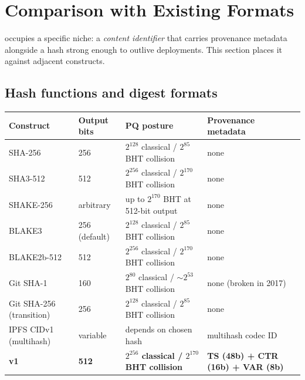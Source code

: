 \section{Comparison with Existing Formats}
\label{sec:comparison}

\tesserahash{} occupies a specific niche: a \emph{content identifier} that carries provenance metadata alongside a hash strong enough to outlive deployments. This section places it against adjacent constructs.

\subsection{Hash functions and digest formats}

\begin{center}
\small
\begin{tabularx}{\textwidth}{@{}lXXX@{}}
\toprule
\textbf{Construct} & \textbf{Output bits} & \textbf{PQ posture} & \textbf{Provenance metadata} \\
\midrule
SHA-256                         & 256  & $2^{128}$ classical / $2^{85}$ BHT collision        & none \\
SHA3-512 \citep{fips202}        & 512  & $2^{256}$ classical / $2^{170}$ BHT collision       & none \\
SHAKE-256 \citep{fips202}       & arbitrary & up to $2^{170}$ BHT at 512-bit output           & none \\
BLAKE3                          & 256 (default) & $2^{128}$ classical / $2^{85}$ BHT collision  & none \\
BLAKE2b-512                     & 512  & $2^{256}$ classical / $2^{170}$ BHT collision       & none \\
Git SHA-1                       & 160  & $2^{80}$ classical / $\sim 2^{53}$ BHT collision    & none (broken in 2017) \\
Git SHA-256 (transition)        & 256  & $2^{128}$ classical / $2^{85}$ BHT collision        & none \\
IPFS CIDv1 (multihash)          & variable & depends on chosen hash                          & multihash codec ID \\
\textbf{\tesserahash{} v1}           & \textbf{512} & \textbf{$2^{256}$ classical / $2^{170}$ BHT collision} & \textbf{TS (48b) + CTR (16b) + VAR (8b)} \\
\bottomrule
\end{tabularx}
\end{center}


